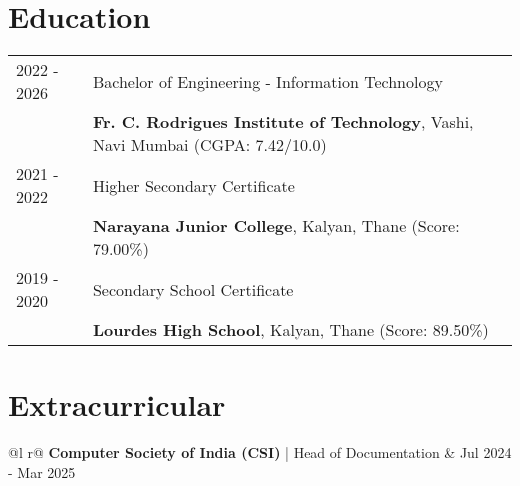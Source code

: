 \documentclass[a4paper,12pt]{article}
\begin{document}
\section{Education}
\begin{tabularx}{\linewidth}{@{}l X@{}}	
2022 - 2026 & Bachelor of Engineering - Information Technology \\
& \textbf{Fr. C. Rodrigues Institute of Technology}, Vashi, Navi Mumbai \hfill \normalsize (CGPA: 7.42/10.0) \\[5pt]

2021 - 2022 & Higher Secondary Certificate \\
& \textbf{Narayana Junior College}, Kalyan, Thane \hfill (Score: 79.00\%) \\[5pt]

2019 - 2020 & Secondary School Certificate \\
& \textbf{Lourdes High School}, Kalyan, Thane \hfill (Score: 89.50\%) \\
\end{tabularx}

\section{Extracurricular}
\begin{tabularx}{\linewidth}{ @{}l r@{} }
\textbf{Computer Society of India (CSI)} | Head of Documentation & \hfill Jul 2024 - Mar 2025 \\[3.75pt]
\end{tabularx}

\vfill
{}
\end{document}
